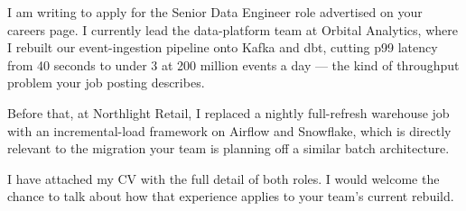 \documentclass[11pt,a4paper,sans]{moderncv}
\date{\today}
\begin{document}
\makelettertitle

I am writing to apply for the Senior Data Engineer role advertised on your
careers page. I currently lead the data-platform team at Orbital Analytics,
where I rebuilt our event-ingestion pipeline onto Kafka and dbt, cutting
p99 latency from 40 seconds to under 3 at 200 million events a day — the
kind of throughput problem your job posting describes.

Before that, at Northlight Retail, I replaced a nightly full-refresh
warehouse job with an incremental-load framework on Airflow and Snowflake,
which is directly relevant to the migration your team is planning off a
similar batch architecture.

I have attached my CV with the full detail of both roles. I would welcome
the chance to talk about how that experience applies to your team's
current rebuild.

\makeletterclosing
\end{document}
